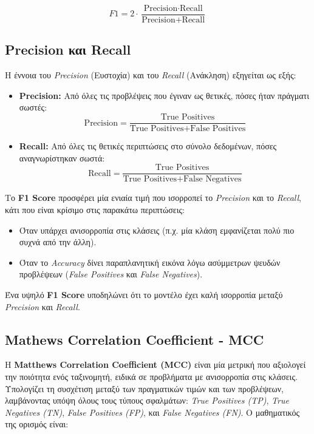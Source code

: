 \documentclass[diploma]{softlab-thesis}
\begin{document}
\[
F1 = 2 \cdot \frac{\text{Precision} \cdot \text{Recall}}{\text{Precision} + \text{Recall}}
\]

\subsection*{Precision και Recall}
Η έννοια του \textit{Precision} (Ευστοχία) και του \textit{Recall} (Ανάκληση) εξηγείται ως εξής:
\begin{itemize}
    \item \textbf{Precision:} Από όλες τις προβλέψεις που έγιναν ως θετικές, πόσες ήταν πράγματι σωστές:
    \[
    \text{Precision} = \frac{\text{True Positives}}{\text{True Positives} + \text{False Positives}}
    \]
    \item \textbf{Recall:} Από όλες τις θετικές περιπτώσεις στο σύνολο δεδομένων, πόσες αναγνωρίστηκαν σωστά:
    \[
    \text{Recall} = \frac{\text{True Positives}}{\text{True Positives} + \text{False Negatives}}
    \]
\end{itemize}


Το \textbf{F1 Score} προσφέρει μία ενιαία τιμή που ισορροπεί το \textit{Precision} και το \textit{Recall}, κάτι που είναι κρίσιμο στις παρακάτω περιπτώσεις:
\begin{itemize}
    \item Όταν υπάρχει ανισορροπία στις κλάσεις (π.χ. μία κλάση εμφανίζεται πολύ πιο συχνά από την άλλη).
    \item Όταν το \textit{Accuracy} δίνει παραπλανητική εικόνα λόγω ασύμμετρων ψευδών προβλέψεων (\textit{False Positives} και \textit{False Negatives}).
\end{itemize}

Ένα υψηλό \textbf{F1 Score} υποδηλώνει ότι το μοντέλο έχει καλή ισορροπία μεταξύ \textit{Precision} και \textit{Recall}.

\subsection{Mathews Correlation Coefficient - MCC}


H \textbf{Matthews Correlation Coefficient (MCC)} είναι μία μετρική που αξιολογεί την ποιότητα ενός ταξινομητή, ειδικά σε προβλήματα με ανισορροπία στις κλάσεις. Υπολογίζει τη συσχέτιση μεταξύ των πραγματικών τιμών και των προβλέψεων, λαμβάνοντας υπόψη όλους τους τύπους σφαλμάτων: \textit{True Positives (TP)}, \textit{True Negatives (TN)}, \textit{False Positives (FP)}, και \textit{False Negatives (FN)}. Ο μαθηματικός της ορισμός είναι:
\end{document}

